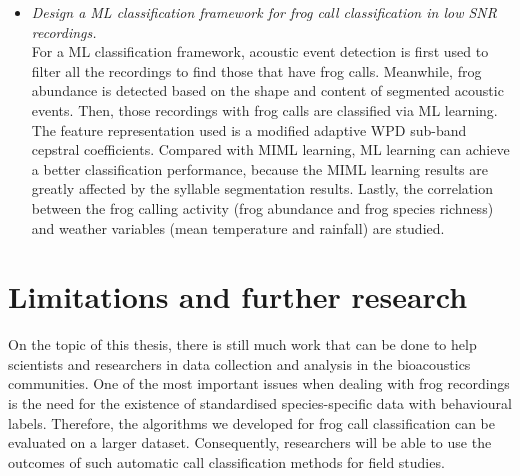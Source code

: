 \begin{itemize}
\item  \textit{Design a ML classification framework for frog call classification in low SNR recordings.} 
\\
For a ML classification framework, acoustic event detection is first used to filter all the recordings to find those that have frog calls. Meanwhile, frog abundance is detected based on the shape and content of segmented acoustic events. Then, those recordings with frog calls are classified via ML learning. The feature representation used is a modified adaptive WPD sub-band cepstral coefficients. Compared with MIML learning, ML learning can achieve a better classification performance, because the MIML learning results are greatly affected by the syllable segmentation results. Lastly, the correlation between the frog calling activity (frog abundance and frog species richness) and weather variables (mean temperature and rainfall) are studied.

\end{itemize}

%
%


\section{Limitations and further research}	
On the topic of this thesis, there is still much work that can be done to help scientists and researchers in data collection and analysis in the bioacoustics communities. One of the most important issues when dealing with frog recordings is the need for the existence of standardised species-specific data with behavioural labels. 
Therefore, the algorithms we developed for frog call classification can be evaluated on a larger dataset. 
Consequently, researchers will be able to use the outcomes of such automatic call classification methods for field studies.

